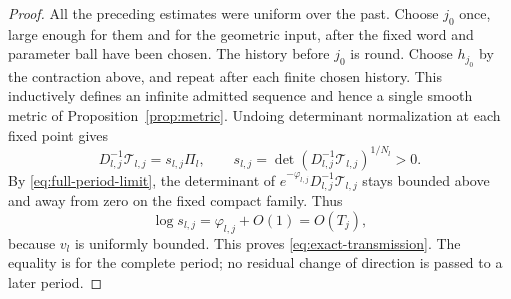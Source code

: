 \begin{proof}
All the preceding estimates were uniform over the past.
Choose \(j_0\) once, large enough for them and for the geometric
input, after the fixed word and parameter ball have been chosen.
The history before \(j_0\) is round.  Choose \(h_{j_0}\) by the
contraction above, and repeat after each finite chosen history.
This inductively defines an infinite admitted sequence and
hence a single smooth metric of Proposition~\ref{prop:metric}.
Undoing determinant normalization at each fixed point gives
\[
 D_{l,j}^{-1}\mathcal T_{l,j}=s_{l,j}\Pi_l,\qquad
 s_{l,j}=\det(D_{l,j}^{-1}\mathcal T_{l,j})^{1/N_l}>0.
\]
By \eqref{eq:full-period-limit}, the determinant of
\(e^{-\varphi_{l,j}}D_{l,j}^{-1}\mathcal T_{l,j}\) stays
bounded above and away from zero on the fixed compact family.
Thus
\[
 \log s_{l,j}=\varphi_{l,j}+O(1)=O(T_j),
\]
because \(v_l\) is uniformly bounded.  This proves
\eqref{eq:exact-transmission}.  The equality is for the complete
period; no residual change of direction is passed to a later
period.

\end{proof}
